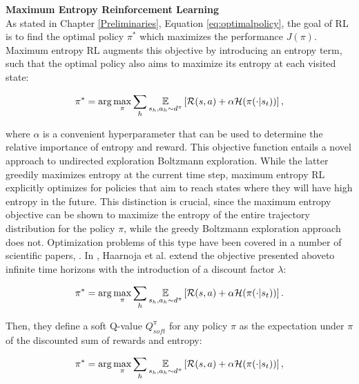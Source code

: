 \textbf{Maximum Entropy Reinforcement Learning} \\
As stated in Chapter \ref{Preliminaries}, Equation \ref{eq:optimalpolicy}, the goal of \gls{RL} is to find the optimal policy $\pi^*$ which maximizes the performance $J(\pi)$. Maximum entropy \gls{RL} augments this objective by introducing an entropy term, such that the optimal policy also aims to maximize its entropy at each visited state:

\begin{align}
\pi^*=\arg\max_\pi\sum_h\underset{s_h,a_h\sim d^{\pi}}{\mathbb{E}}\left[{\mathcal{R}(s,a)+\alpha\mathcal{H}(\pi(\cdot|s_t))}\right],
\end{align}

where $\alpha$ is a convenient hyperparameter that can be used to determine the relative importance of entropy and reward. This objective function entails a novel approach to undirected exploration \wrt Boltzmann  exploration. While the latter greedily maximizes entropy at the current time step, maximum entropy \gls{RL} explicitly optimizes for policies that aim to reach states where they will have high entropy in the future. This
distinction is crucial, since the maximum entropy objective can be shown to maximize the entropy of the entire trajectory distribution for the policy $\pi$, while the greedy Boltzmann exploration approach does not. Optimization problems of this type have been covered in a number of scientific papers, \eg \cite{kappen2005path, ziebart2008maximum, haarnoja2017reinforcement}. In \cite{haarnoja2017reinforcement},  Haarnoja et al. extend the objective presented aboveto infinite time horizons with the introduction of a discount factor $\lambda$:

\begin{align}
\pi^*=\arg\max_\pi\sum_h\underset{s_h,a_h\sim d^{\pi}}{\mathbb{E}}\left[{\mathcal{R}(s,a)+\alpha\mathcal{H}(\pi(\cdot|s_t))}\right].
\end{align}

Then, they define a soft Q-value $Q_{soft}^{\pi}$ for any policy $\pi$ as the expectation under $\pi$ of the discounted sum of rewards and entropy:

\begin{align}
\pi^*=\arg\max_\pi\sum_h\underset{s_h,a_h\sim d^{\pi}}{\mathbb{E}}\left[{\mathcal{R}(s,a)+\alpha\mathcal{H}(\pi(\cdot|s_t))}\right],
\end{align}

